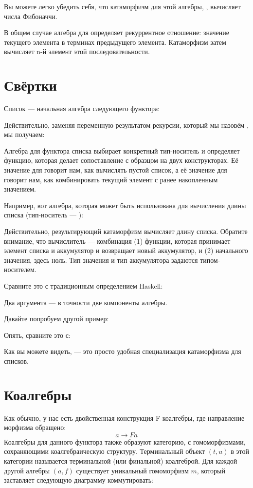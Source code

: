 Вы можете легко убедить себя, что катаморфизм для этой алгебры,
, вычисляет числа Фибоначчи.

В общем случае алгебра для  определяет рекуррентное отношение:
значение текущего элемента в терминах предыдущего элемента.
Катаморфизм затем вычисляет n-й элемент этой последовательности.

\section{Свёртки}

Список  --- начальная алгебра следующего функтора:

Действительно, заменяя переменную  результатом рекурсии,
который мы назовём , мы получаем:

Алгебра для функтора списка выбирает конкретный тип-носитель и
определяет функцию, которая делает сопоставление с образцом на двух конструкторах.
Её значение для  говорит нам, как вычислять пустой список, а
её значение для  говорит нам, как комбинировать текущий элемент
с ранее накопленным значением.

Например, вот алгебра, которая может быть использована для вычисления длины
списка (тип-носитель --- ):

Действительно, результирующий катаморфизм  вычисляет
длину списка. Обратите внимание, что вычислитель --- комбинация (1)
функции, которая принимает элемент списка и аккумулятор и возвращает новый
аккумулятор, и (2) начального значения, здесь ноль. Тип значения
и тип аккумулятора задаются типом-носителем.

Сравните это с традиционным определением Haskell:

Два аргумента  --- в точности две компоненты
алгебры.

Давайте попробуем другой пример:

Опять, сравните это с:

Как вы можете видеть,  --- это просто удобная специализация
катаморфизма для списков.

\section{Коалгебры}

Как обычно, у нас есть двойственная конструкция F-коалгебры, где
направление морфизма обращено:
\[a \to F a\]
Коалгебры для данного функтора также образуют категорию, с гомоморфизмами,
сохраняющими коалгебраическую структуру. Терминальный объект
$(t, u)$ в этой категории называется терминальной (или финальной)
коалгеброй. Для каждой другой алгебры $(a, f)$ существует уникальный
гомоморфизм $m$, который заставляет следующую диаграмму коммутировать:


